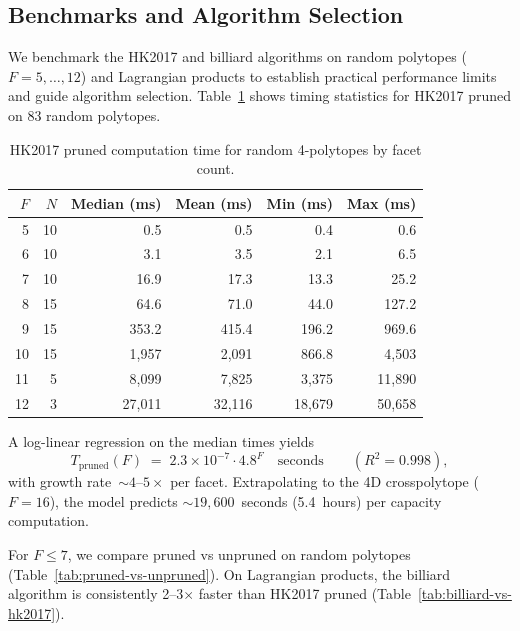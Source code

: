 %

\subsection{Benchmarks and Algorithm Selection}
\label{sec:benchmark}

We benchmark the HK2017 and billiard algorithms on random polytopes
($F = 5, \ldots, 12$) and Lagrangian products to establish practical
performance limits and guide algorithm selection. Table~\ref{tab:benchmark-stats}
shows timing statistics for HK2017 pruned on 83 random polytopes.

\begin{table}[h]
\centering
\begin{tabular}{rrrrrr}
\toprule
$F$ & $N$ & Median (ms) & Mean (ms) & Min (ms) & Max (ms) \\
\midrule
 5 & 10 &       0.5 &       0.5 &      0.4 &       0.6 \\
 6 & 10 &       3.1 &       3.5 &      2.1 &       6.5 \\
 7 & 10 &      16.9 &      17.3 &     13.3 &      25.2 \\
 8 & 15 &      64.6 &      71.0 &     44.0 &     127.2 \\
 9 & 15 &     353.2 &     415.4 &    196.2 &     969.6 \\
10 & 15 &   1{,}957 &   2{,}091 &    866.8 &   4{,}503 \\
11 &  5 &   8{,}099 &   7{,}825 &  3{,}375 &  11{,}890 \\
12 &  3 &  27{,}011 &  32{,}116 & 18{,}679 &  50{,}658 \\
\bottomrule
\end{tabular}
\caption{HK2017 pruned computation time for random 4-polytopes by facet count.}
\label{tab:benchmark-stats}
\end{table}

A log-linear regression on the median times yields
\[
  T_{\mathrm{pruned}}(F) \;=\; 2.3 \times 10^{-7} \cdot 4.8^F \quad\text{seconds}
  \qquad (R^2 = 0.998),
\]
with growth rate~${\sim}4\text{--}5\times$ per facet. Extrapolating to the
4D crosspolytope ($F = 16$), the model predicts ${\sim}19{,}600$~seconds
(5.4~hours) per capacity computation.

For $F \le 7$, we compare pruned vs unpruned on random polytopes
(Table~\ref{tab:pruned-vs-unpruned}). On Lagrangian products, the billiard
algorithm is consistently 2--3$\times$ faster than HK2017 pruned
(Table~\ref{tab:billiard-vs-hk2017}).

